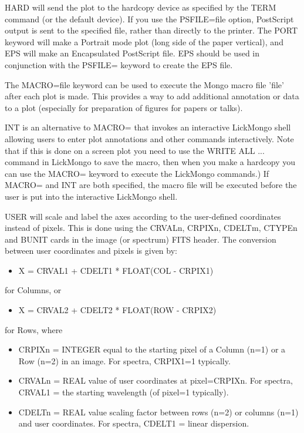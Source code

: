 HARD will send the plot to the hardcopy device as specified by the TERM
command (or the default device). If you use the PSFILE=file option,
PostScript output is sent to the specified file, rather than directly to
the printer.  The PORT keyword will make a Portrait mode plot (long side of
the paper vertical), and EPS will make an Encapsulated PostScript file.
EPS should be used in conjunction with the PSFILE= keyword to create the
EPS file.

The MACRO=file keyword can be used to execute the Mongo macro file 'file'
after each plot is made.  This provides a way to add additional annotation
or data to a plot (especially for preparation of figures for papers or
talks).

INT is an alternative to MACRO= that invokes an interactive LickMongo shell
allowing users to enter plot annotations and other commands interactively.
Note that if this is done on a screen plot you need to use the WRITE ALL
... command in LickMongo to save the macro, then when you make a hardcopy
you can use the MACRO= keyword to execute the LickMongo commands.)  If
MACRO= and INT are both specified, the macro file will be executed before
the user is put into the interactive LickMongo shell.

USER will scale and label the axes according to the user-defined
coordinates instead of pixels.  This is done using the CRVALn, CRPIXn,
CDELTm, CTYPEn and BUNIT cards in the image (or spectrum) FITS header.  The
conversion between user coordinates and pixels is given by:
\begin{itemize}
  \item{X = CRVAL1 + CDELT1 * FLOAT(COL - CRPIX1)}
\end{itemize}
for Columns, or
\begin{itemize}
  \item{X = CRVAL2 + CDELT2 * FLOAT(ROW - CRPIX2)}
\end{itemize}
for Rows, where
\begin{itemize}
  \item[]{CRPIXn = INTEGER equal to the starting pixel of a Column (n=1)
         or a Row (n=2) in an image.  For spectra, CRPIX1=1 typically.}
  \item[]{CRVALn = REAL value of user coordinates at pixel=CRPIXn.  For
         spectra, CRVAL1 = the starting wavelength (of pixel=1 typically).}
  \item[]{CDELTn = REAL value scaling factor between rows (n=2) or columns
         (n=1) and user coordinates.  For spectra, CDELT1 = linear dispersion.}
\end{itemize}

